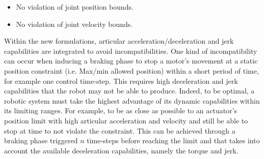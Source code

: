 \documentclass[a4paper, 10pt, conference]{ieeeconf}      %
\begin{document}
\begin{itemize}
\item No violation of joint position bounds.
\item No violation of joint velocity bounds.
\end{itemize}
Within the new formulations, articular acceleration/deceleration and jerk capabilities are integrated to avoid incompatibilities. One kind of incompatibility can occur when inducing a braking phase to stop a motor's movement at a static
position constraint (i.e. Max/min allowed position) within a short period of time, for example one control time-step. This requires high deceleration and jerk capabilities that the robot may not be able to produce. Indeed, to be optimal, a robotic system must take the highest advantage of its dynamic capabilities within its limiting ranges. For example, to be as close as possible to an actuator's position limit with high articular acceleration and velocity and still be able to stop at time to not violate the constraint. This can be achieved through a braking phase triggered $n$ time-steps before reaching the limit and that takes into account the available deceleration capabilities, namely the torque and jerk. 
\end{document}
